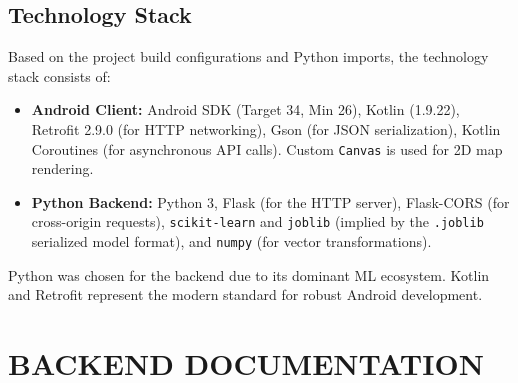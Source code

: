 \documentclass[11pt,a4paper]{article}
\begin{document}
\subsection{Technology Stack}
Based on the project build configurations and Python imports, the technology stack consists of:
\begin{itemize}
\item \textbf{Android Client:} Android SDK (Target 34, Min 26), Kotlin (1.9.22), Retrofit 2.9.0 (for HTTP networking), Gson (for JSON serialization), Kotlin Coroutines (for asynchronous API calls). Custom \texttt{Canvas} is used for 2D map rendering.
\item \textbf{Python Backend:} Python 3, Flask (for the HTTP server), Flask-CORS (for cross-origin requests), \texttt{scikit-learn} and \texttt{joblib} (implied by the \texttt{.joblib} serialized model format), and \texttt{numpy} (for vector transformations).
\end{itemize}
Python was chosen for the backend due to its dominant ML ecosystem. Kotlin and Retrofit represent the modern standard for robust Android development.
\section{BACKEND DOCUMENTATION}
\end{document}
